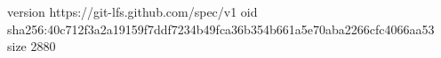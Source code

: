 version https://git-lfs.github.com/spec/v1
oid sha256:40c712f3a2a19159f7ddf7234b49fca36b354b661a5e70aba2266cfc4066aa53
size 2880
